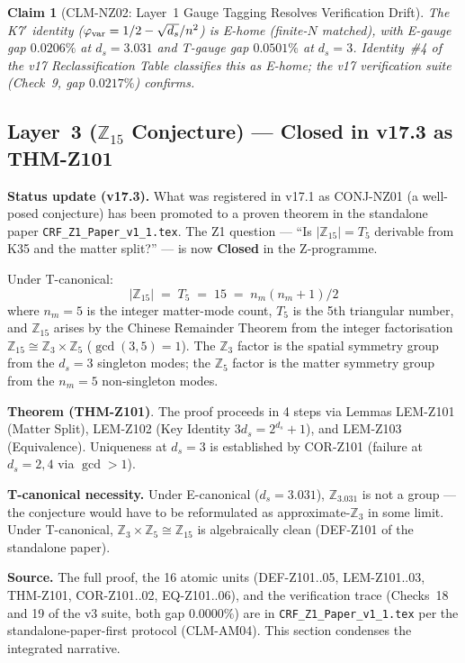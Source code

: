 \documentclass[12pt, a4paper]{article}
\newtheorem{claim}{Claim}[section]   %
\begin{document}
\begin{claim}[CLM-NZ02: Layer~1 Gauge Tagging Resolves Verification Drift]
The K7$'$ identity ($\varphi_{\rm var} = 1/2 - \sqrt{d_s}/n^2$) is
E-home (finite-$N$ matched), with E-gauge gap $0.0206\%$ at $d_s=3.031$
and T-gauge gap $0.0501\%$ at $d_s=3$. Identity~\#4 of the v17
Reclassification Table classifies this as E-home; the v17 verification
suite (Check~9, gap $0.0217\%$) confirms.
\end{claim}

\subsection{Layer~3 ($\mathbb{Z}_{15}$ Conjecture) --- \textbf{Closed in v17.3 as THM-Z101}}

\begin{formalbox}[title={CONJ-NZ01 $\to$ THM-Z101: Integer Group Structure (Z1 Closed)}]
\textbf{Status update (v17.3).} What was registered in v17.1 as
CONJ-NZ01 (a well-posed conjecture) has been promoted to a proven
theorem in the standalone paper \texttt{CRF\_Z1\_Paper\_v1\_1.tex}.
The Z1 question --- ``Is $|\mathbb{Z}_{15}| = T_5$ derivable from K35
and the matter split?'' --- is now \textbf{Closed} in the
Z-programme.

\smallskip
Under T-canonical:
\[
  \boxed{|\mathbb{Z}_{15}| \;=\; T_5 \;=\; 15
         \;=\; n_m(n_m+1)/2}
\]
where $n_m = 5$ is the integer matter-mode count, $T_5$ is the 5th
triangular number, and $\mathbb{Z}_{15}$ arises by the Chinese
Remainder Theorem from the integer factorisation
$\mathbb{Z}_{15} \cong \mathbb{Z}_3 \times \mathbb{Z}_5$
($\gcd(3,5) = 1$). The $\mathbb{Z}_3$ factor is the spatial symmetry
group from the $d_s = 3$ singleton modes; the $\mathbb{Z}_5$ factor
is the matter symmetry group from the $n_m = 5$ non-singleton modes.

\textbf{Theorem (THM-Z101)}. The proof proceeds in 4 steps via
Lemmas LEM-Z101 (Matter Split), LEM-Z102 (Key Identity
$3d_s = 2^{d_s} + 1$), and LEM-Z103 (Equivalence). Uniqueness at
$d_s = 3$ is established by COR-Z101 (failure at $d_s = 2, 4$ via
$\gcd > 1$).

\textbf{T-canonical necessity.} Under E-canonical ($d_s = 3.031$),
$\mathbb{Z}_{3.031}$ is not a group --- the conjecture would have to
be reformulated as approximate-$\mathbb{Z}_3$ in some limit. Under
T-canonical, $\mathbb{Z}_3 \times \mathbb{Z}_5 \cong \mathbb{Z}_{15}$
is algebraically clean (DEF-Z101 of the standalone paper).

\textbf{Source.} The full proof, the 16 atomic units (DEF-Z101..05,
LEM-Z101..03, THM-Z101, COR-Z101..02, EQ-Z101..06), and the verification
trace (Checks~18 and 19 of the v3 suite, both gap $0.0000\%$) are in
\texttt{CRF\_Z1\_Paper\_v1\_1.tex} per the standalone-paper-first
protocol (CLM-AM04). This section condenses the integrated narrative.
\end{formalbox}
\end{document}
